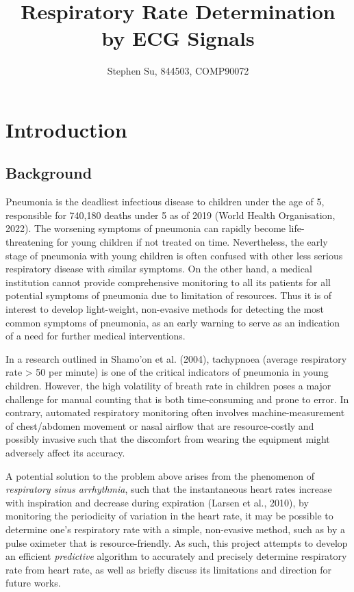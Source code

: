 \documentclass[
]{article}
\title{Respiratory Rate Determination by ECG Signals}
\author{Stephen Su, 844503, COMP90072}
\date{}
\begin{document}
\maketitle

\hypertarget{introduction}{%
\section{Introduction}\label{introduction}}

\hypertarget{background}{%
\subsection{Background}\label{background}}

Pneumonia is the deadliest infectious disease to children under the age
of 5, responsible for 740,180 deaths under 5 as of 2019 (World Health
Organisation, 2022). The worsening symptoms of pneumonia can rapidly
become life-threatening for young children if not treated on time.
Nevertheless, the early stage of pneumonia with young children is often
confused with other less serious respiratory disease with similar
symptoms. On the other hand, a medical institution cannot provide
comprehensive monitoring to all its patients for all potential symptoms
of pneumonia due to limitation of resources. Thus it is of interest to
develop light-weight, non-evasive methods for detecting the most common
symptoms of pneumonia, as an early warning to serve as an indication of
a need for further medical interventions.

In a research outlined in Shamo'on et al. (2004), tachypnoea (average
respiratory rate \textgreater{} 50 per minute) is one of the critical
indicators of pneumonia in young children. However, the high volatility
of breath rate in children poses a major challenge for manual counting
that is both time-consuming and prone to error. In contrary, automated
respiratory monitoring often involves machine-measurement of
chest/abdomen movement or nasal airflow that are resource-costly and
possibly invasive such that the discomfort from wearing the equipment
might adversely affect its accuracy.

A potential solution to the problem above arises from the phenomenon of
\emph{respiratory sinus arrhythmia}, such that the instantaneous heart
rates increase with inspiration and decrease during expiration (Larsen
et al., 2010), by monitoring the periodicity of variation in the heart
rate, it may be possible to determine one's respiratory rate with a
simple, non-evasive method, such as by a pulse oximeter that is
resource-friendly. As such, this project attempts to develop an
efficient \emph{predictive} algorithm to accurately and precisely
determine respiratory rate from heart rate, as well as briefly discuss
its limitations and direction for future works.
\end{document}
